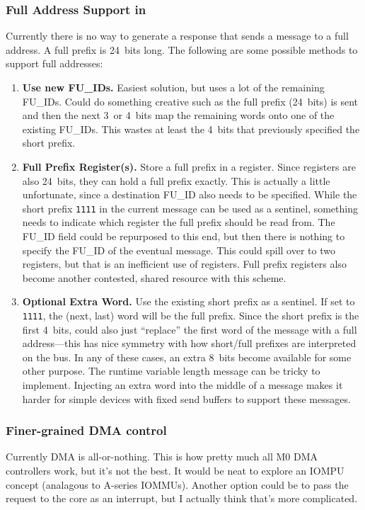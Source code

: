 \subsubsection{Full Address Support in \proto}
\label{sec:todo-full-addr}
Currently there is no way to generate a response that sends a message to a
full address. A full prefix is 24~bits long. The following are some possible
methods to support full addresses:
\begin{enumerate}
  \item {\bf Use new FU\_IDs.} Easiest solution, but uses a lot of the
    remaining FU\_IDs. Could do something creative such as the full prefix
    (24~bits) is sent and then the next 3~or 4~bits map the remaining words
    onto one of the existing FU\_IDs. This wastes at least the 4~bits that
    previously specified the short prefix.
  \item {\bf Full Prefix Register(s).} Store a full prefix in a register.
    Since registers are also 24~bits, they can hold a full prefix exactly.
    This is actually a little unfortunate, since a destination FU\_ID also
    needs to be specified. While the short prefix {\tt 1111} in the current
    message can be used as a sentinel, something needs to indicate which
    register the full prefix should be read from. The FU\_ID field could be
    repurposed to this end, but then there is nothing to specify the FU\_ID of
    the eventual message. This could spill over to two registers, but that is
    an inefficient use of registers. Full prefix registers also become another
    contested, shared resource with this scheme.
  \item {\bf Optional Extra Word.} Use the existing short prefix as a
    sentinel. If set to {\tt 1111}, the (next, last) word will be the full
    prefix. Since the short prefix is the first 4~bits, could also just
    ``replace'' the first word of the message with a full address---this has
    nice symmetry with how short/full prefixes are interpreted on the bus. In
    any of these cases, an extra 8~bits become available for some other
    purpose. The runtime variable length message can be tricky to implement.
    Injecting an extra word into the middle of a message makes it harder for
    simple devices with fixed send buffers to support these messages.
\end{enumerate}

\subsubsection{Finer-grained DMA control}
\label{sec:todo-fine-grain-dma}
Currently DMA is all-or-nothing. This is how pretty much all M0 DMA
controllers work, but it's not the best. It would be neat to explore an IOMPU
concept (analagous to A-series IOMMUs). Another option could be to pass the
request to the core as an interrupt, but I actually think that's more
complicated.



